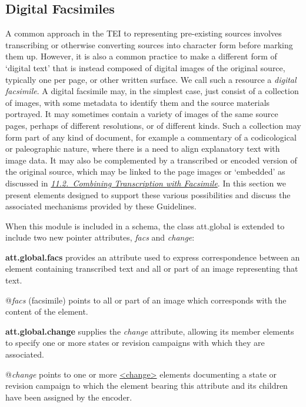 \subsection[{Digital Facsimiles}]{Digital Facsimiles}\label{PHFAX}\par
A common approach in the TEI to representing pre-existing sources involves transcribing or otherwise converting sources into character form before marking them up. However, it is also a common practice to make a different form of ‘digital text’ that is instead composed of digital images of the original source, typically one per page, or other written surface. We call such a resource a \textit{digital facsimile}. A digital facsimile may, in the simplest case, just consist of a collection of images, with some metadata to identify them and the source materials portrayed. It may sometimes contain a variety of images of the same source pages, perhaps of different resolutions, or of different kinds. Such a collection may form part of any kind of document, for example a commentary of a codicological or paleographic nature, where there is a need to align explanatory text with image data. It may also be complemented by a transcribed or encoded version of the original source, which may be linked to the page images or ‘embedded’ as discussed in \textit{\hyperref[PH-transcr]{11.2.\ Combining Transcription with Facsimile}}. In this section we present elements designed to support these various possibilities and discuss the associated mechanisms provided by these Guidelines.\par
When this module is included in a schema, the class \textsf{att.global} is extended to include two new pointer attributes, {\itshape facs} and {\itshape change}: 
\begin{sansreflist}
  
\item [\textbf{att.global.facs}] provides an attribute used to express correspondence between an element containing transcribed text and all or part of an image representing that text.\hfil\\[-10pt]\begin{sansreflist}
    \item[@{\itshape facs}]
  (facsimile) points to all or part of an image which corresponds with the content of the element.
\end{sansreflist}  
\item [\textbf{att.global.change}] supplies the {\itshape change} attribute, allowing its member elements to specify one or more states or revision campaigns with which they are associated.\hfil\\[-10pt]\begin{sansreflist}
    \item[@{\itshape change}]
  points to one or more \hyperref[TEI.change]{<change>} elements documenting a state or revision campaign to which the element bearing this attribute and its children have been assigned by the encoder.
\end{sansreflist}  
\end{sansreflist}
